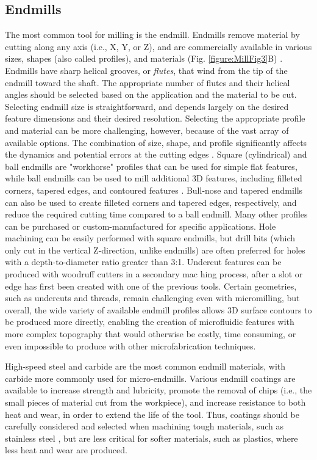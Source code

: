 {\subsection{Endmills}
The most common tool for milling is the endmill. Endmills remove material by cutting along any axis (i.e., X, Y, or Z), and are commercially available in various sizes, shapes (also called profiles), and materials (Fig. \ref{figure:MillFig3}B) \cite{Kim2008}. Endmills have sharp helical grooves, or \textit{flutes}, that wind from the tip of the endmill toward the shaft. The appropriate number of flutes and their helical angles should be selected based on the application and the material to be cut. Selecting endmill size is straightforward, and depends largely on the desired feature dimensions and their desired resolution. Selecting the appropriate profile and material can be more challenging, however, because of the vast array of available options. The combination of size, shape, and profile significantly affects the dynamics and potential errors at the cutting edges \cite{Jun2006}. Square (cylindrical) and ball endmills are "workhorse" profiles that can be used for simple flat features, while ball endmills can be used to mill additional 3D features, including filleted corners, tapered edges, and contoured features \cite{Wilson2011}. Bull-nose and tapered endmills can also be used to create filleted corners and tapered edges, respectively, and reduce the required cutting time compared to a ball endmill. Many other profiles can be purchased or custom-manufactured for specific applications. Hole machining can be easily performed with square endmills, but drill bits (which only cut in the vertical Z-direction, unlike endmills) are often preferred for holes with a depth-to-diameter ratio greater than 3:1. Undercut features can be produced with woodruff cutters in a secondary mac hing process, after a slot or edge has first been created with one of the previous tools. Certain geometries, such as undercuts and threads, remain challenging even with micromilling, but overall, the wide variety of available endmill profiles allows 3D surface contours to be produced more directly, enabling the creation of microfluidic features with more complex topography that would otherwise be costly, time consuming, or even impossible to produce with other microfabrication techniques.

High-speed steel and carbide are the most common endmill materials, with carbide more commonly used for micro-endmills. Various endmill coatings are available to increase strength and lubricity, promote the removal of chips (i.e., the small pieces of material cut from the workpiece), and increase resistance to both heat and wear, in order to extend the life of the tool. Thus, coatings should be carefully considered and selected when machining tough materials, such as stainless steel \cite{Aramchareon2008, Endrino2006}, but are less critical for softer materials, such as plastics, where less heat and wear are produced. 

}

